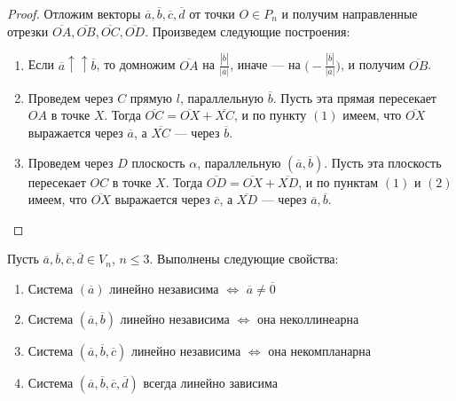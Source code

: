     \begin{proof}
    	Отложим векторы $\overline{a}, \overline{b}, \overline{c}, \overline{d}$ от точки $O \in P_n$ и получим направленные отрезки $\overline{OA}, \overline{OB}, \overline{OC}, \overline{OD}$. Произведем следующие построения:
    	\begin{enumerate}
    		\item Если $\overline{a} \uparrow\uparrow \overline{b}$, то домножим $\overline{OA}$ на $\frac{|\overline{b}|}{|\overline{a}|}$, иначе --- на $\big(\!-\!\frac{|\overline{b}|}{|\overline{a}|}\big)$, и получим $\overline{OB}$.
    		\item Проведем через $C$ прямую $l$, параллельную $\overline{b}$. Пусть эта прямая пересекает $OA$ в точке $X$. Тогда $\overline{OC} = \overline{OX} + \overline{XC}$, и по пункту $(1)$ имеем, что $\overline{OX}$ выражается через $\overline{a}$, а $\overline{XC}$ --- через $\overline{b}$.
    		\item Проведем через $D$ плоскость $\alpha$, параллельную $(\overline{a}, \overline{b})$. Пусть эта плоскость пересекает $OC$ в точке $X$. Тогда $\overline{OD} = \overline{OX} + \overline{XD}$, и по пунктам $(1)$ и $(2)$ имеем, что $\overline{OX}$ выражается через $\overline{c}$, а $\overline{XD}$ --- через $\overline{a}, \overline{b}$.\qedhere
    	\end{enumerate}
    \end{proof}
    
    \begin{theorem}
    	Пусть $\overline{a}, \overline{b}, \overline{c}, \overline{d} \in V_n$, $n \leq 3$. Выполнены следующие свойства:
    	\begin{enumerate}
    		\item Система $(\overline{a})$ линейно независима $\Leftrightarrow$ $\overline{a} \ne \overline{0}$
    		\item Система $(\overline{a}, \overline{b})$ линейно независима $\Leftrightarrow$ она неколлинеарна
    		\item Система $(\overline{a}, \overline{b}, \overline{c})$ линейно независима $\Leftrightarrow$ она некомпланарна
    		\item Система $(\overline{a}, \overline{b}, \overline{c}, \overline{d})$ всегда линейно зависима
    	\end{enumerate}
    \end{theorem}
    
